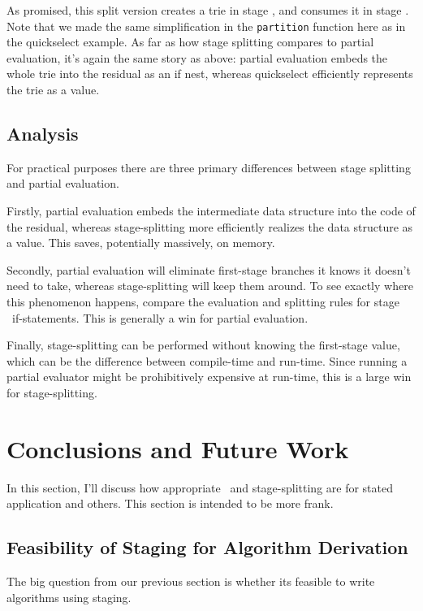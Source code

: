 As promised, this split version creates a trie in stage \bbone, and consumes it in stage \bbtwo.
Note that we made the same simplification in the {\tt partition} function here as in the quickselect example.
As far as how stage splitting compares to partial evaluation, it's again the same story as above:
partial evaluation embeds the whole trie into the residual as an if nest, 
whereas quickselect efficiently represents the trie as a value.

\subsection{Analysis}

For practical purposes there are three primary differences between stage splitting and partial evaluation.

Firstly, partial evaluation embeds the intermediate data structure into the code of the residual, whereas
stage-splitting more efficiently realizes the data structure as a value.  This saves, potentially massively, on memory.

Secondly, partial evaluation will eliminate first-stage branches it knows it doesn't need to take,
whereas stage-splitting will keep them around.  
To see exactly where this phenomenon happens, compare the evaluation and splitting rules for stage \bbone\ if-statements.
This is generally a win for partial evaluation.

Finally, stage-splitting can be performed without knowing the first-stage value,
which can be the difference between compile-time and run-time.
Since running a partial evaluator might be prohibitively expensive at run-time, this is a large win for stage-splitting.

\section{Conclusions and Future Work}

In this section, I'll discuss how appropriate \lang\ and stage-splitting are for stated application and others.  
This section is intended to be more frank.

\subsection{Feasibility of Staging for Algorithm Derivation}

The big question from our previous section is whether its feasible to write algorithms using staging.  

